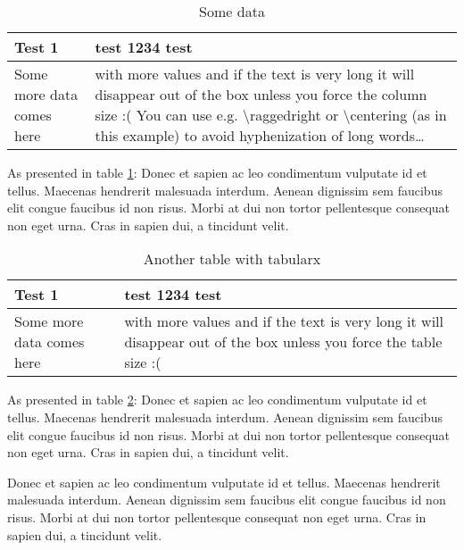 \begin{table}[h]
  \centering
  \caption{Some data}%
  \vspace{-16.5pt}%
  \begin{tabular}{| l | >{\centering\arraybackslash}p{} |}
    \hline
    Test 1 & test 1234 test \\
    \hline
    Some more data comes here & with more values and if the text is very long it will disappear out of the box unless you force the column size :( You can use e.g. \textbackslash raggedright or \textbackslash centering (as in this example) to avoid hyphenization of long words\ldots \\
    \hline
  \end{tabular}
  \label{table:some_data}
\end{table}

As presented in table \ref{table:some_data}: Donec et sapien ac leo condimentum vulputate id et tellus. Maecenas hendrerit malesuada interdum. Aenean dignissim sem faucibus elit congue faucibus id non risus. Morbi at dui non tortor pellentesque consequat non eget urna. Cras in sapien dui, a tincidunt velit.

\begin{table}[h]
  \centering
  \caption{Another table with tabularx}
  \begin{tabularx}{.95\textwidth}{| l | >{\centering\arraybackslash} X |}
    \hline
    Test 1 & test 1234 test \\
    \hline
    Some more data comes here & with more values and if the text is very long it will disappear out of the box unless you force the table size :( \\
    \hline
  \end{tabularx}
  \label{table:some_data2}
\end{table}

As presented in table \ref{table:some_data2}: Donec et sapien ac leo condimentum vulputate id et tellus. Maecenas hendrerit malesuada interdum. Aenean dignissim sem faucibus elit congue faucibus id non risus. Morbi at dui non tortor pellentesque consequat non eget urna. Cras in sapien dui, a tincidunt velit.

Donec et sapien ac leo condimentum vulputate id et tellus. Maecenas hendrerit malesuada interdum. Aenean dignissim sem faucibus elit congue faucibus id non risus. Morbi at dui non tortor pellentesque consequat non eget urna. Cras in sapien dui, a tincidunt velit.

